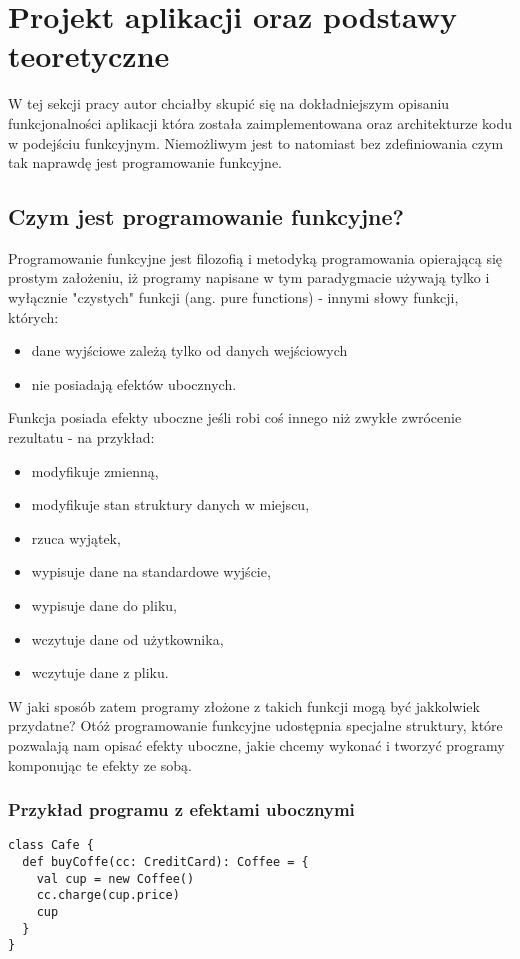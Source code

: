 \documentclass[../main.tex]{subfiles}
\begin{document}
\section{Projekt aplikacji oraz podstawy teoretyczne}
W tej sekcji pracy autor chciałby skupić się na dokładniejszym opisaniu funkcjonalności aplikacji która została zaimplementowana oraz architekturze kodu w podejściu funkcyjnym. Niemożliwym jest to natomiast bez zdefiniowania czym tak naprawdę jest programowanie funkcyjne.


\subsection{Czym jest programowanie funkcyjne?} 
Programowanie funkcyjne jest filozofią i metodyką programowania opierającą się prostym założeniu, iż programy napisane w tym paradygmacie używają tylko i wyłącznie "czystych" funkcji (ang. pure functions) \cite{BOOK:FPinScala} - innymi słowy funkcji, których: 
\begin{itemize}
\item dane wyjściowe zależą tylko od danych wejściowych 
\item nie posiadają efektów ubocznych.
\end{itemize}
\smallskip
Funkcja posiada efekty uboczne jeśli robi coś innego niż zwykłe zwrócenie rezultatu - na przykład: 
\begin{itemize}
    \item modyfikuje zmienną,
    \item modyfikuje stan struktury danych w miejscu,
    \item rzuca wyjątek,
    \item wypisuje dane na standardowe wyjście,
    \item wypisuje dane do pliku,
    \item wczytuje dane od użytkownika,
    \item wczytuje dane z pliku.
\end{itemize}
\smallskip
W jaki sposób zatem programy złożone z takich funkcji mogą być jakkolwiek przydatne? Otóż programowanie funkcyjne udostępnia specjalne struktury, które pozwalają nam opisać efekty uboczne, jakie chcemy wykonać i tworzyć programy komponując te efekty ze sobą.



\subsubsection{Przykład programu z efektami ubocznymi}
\begin{lstlisting}
class Cafe { 
  def buyCoffe(cc: CreditCard): Coffee = {
    val cup = new Coffee()
    cc.charge(cup.price)
    cup
  }
}
\end{lstlisting}
\end{document}
